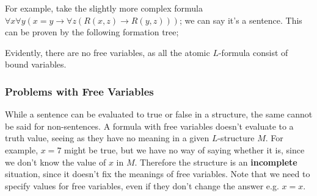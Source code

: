 \documentclass[a4paper, 12pt]{article}
\begin{document}
                For example, take the slightly more complex formula $\forall x \forall y (x = y \rightarrow \forall z (R(x, z) \rightarrow R(y, z)))$; we can say it's a sentence. This can be proven by the following formation tree;
                \begin{center}
                \end{center}
                Evidently, there are no free variables, as all the atomic $L$-formula consist of bound variables.
            \subsubsection*{Problems with Free Variables}
                While a sentence can be evaluated to true or false in a structure, the same cannot be said for non-sentences. A formula with free variables doesn't evaluate to a truth value, seeing as they have no meaning in a given $L$-structure $M$. For example, $x = 7$ might be true, but we have no way of saying whether it is, since we don't know the value of $x$ in $M$. Therefore the structure is an \textbf{incomplete} situation, since it doesn't fix the meanings of free variables. Note that we need to specify values for free variables, even if they don't change the answer e.g. $x = x$.
                \medskip
\end{document}
